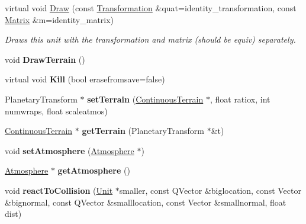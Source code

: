 \begin{DoxyCompactItemize}
\item 
virtual void \hyperlink{classGamePlanet_a006a502b61472d5226bdaf0d55aff6e3}{Draw} (const \hyperlink{structTransformation}{Transformation} \&quat=identity\+\_\+transformation, const \hyperlink{classMatrix}{Matrix} \&m=identity\+\_\+matrix)
\begin{DoxyCompactList}\small\item\em Draws this unit with the transformation and matrix (should be equiv) separately. \end{DoxyCompactList}\item 
void {\bfseries Draw\+Terrain} ()\hypertarget{classGamePlanet_a8725609d2eabde1b41fe0cb8519a2a1b}{}\label{classGamePlanet_a8725609d2eabde1b41fe0cb8519a2a1b}

\item 
virtual void {\bfseries Kill} (bool erasefromsave=false)\hypertarget{classGamePlanet_aa7d8911a448222ab8463988e633f87f8}{}\label{classGamePlanet_aa7d8911a448222ab8463988e633f87f8}

\item 
Planetary\+Transform $\ast$ {\bfseries set\+Terrain} (\hyperlink{classContinuousTerrain}{Continuous\+Terrain} $\ast$, float ratiox, int numwraps, float scaleatmos)\hypertarget{classGamePlanet_a94d801271ee032208cf038aff0211aca}{}\label{classGamePlanet_a94d801271ee032208cf038aff0211aca}

\item 
\hyperlink{classContinuousTerrain}{Continuous\+Terrain} $\ast$ {\bfseries get\+Terrain} (Planetary\+Transform $\ast$\&t)\hypertarget{classGamePlanet_a4b1f42200adede8494383df429f0038a}{}\label{classGamePlanet_a4b1f42200adede8494383df429f0038a}

\item 
void {\bfseries set\+Atmosphere} (\hyperlink{classAtmosphere}{Atmosphere} $\ast$)\hypertarget{classGamePlanet_a70e54f0b428cc59f4cbdcaebb95db708}{}\label{classGamePlanet_a70e54f0b428cc59f4cbdcaebb95db708}

\item 
\hyperlink{classAtmosphere}{Atmosphere} $\ast$ {\bfseries get\+Atmosphere} ()\hypertarget{classGamePlanet_a260a13745f0a7c5a7331e3760f280d56}{}\label{classGamePlanet_a260a13745f0a7c5a7331e3760f280d56}

\item 
void {\bfseries react\+To\+Collision} (\hyperlink{classUnit}{Unit} $\ast$smaller, const Q\+Vector \&biglocation, const Vector \&bignormal, const Q\+Vector \&smalllocation, const Vector \&smallnormal, float dist)\hypertarget{classGamePlanet_acdc71500d1d1a4d1dc2251c9235b67ac}{}\label{classGamePlanet_acdc71500d1d1a4d1dc2251c9235b67ac}

\end{DoxyCompactItemize}
